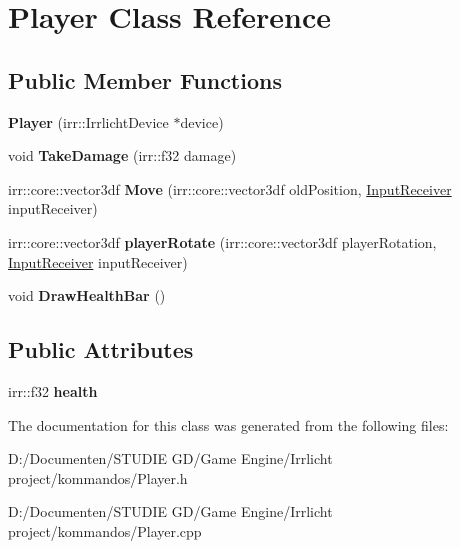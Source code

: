 \hypertarget{class_player}{}\section{Player Class Reference}
\label{class_player}
\subsection*{Public Member Functions}
\begin{DoxyCompactItemize}
\item 
\mbox{\label{class_player_ac207dd2957a2e3c4e734a9a074c2321d}} 
{\bfseries Player} (irr\+::\+Irrlicht\+Device $\ast$device)
\item 
\mbox{\label{class_player_ae9f5a597f15e29673c47abe47c3f1d79}} 
void {\bfseries Take\+Damage} (irr\+::f32 damage)
\item 
\mbox{\label{class_player_a2627aea6b6d7d02b60e449c4040ff592}} 
irr\+::core\+::vector3df {\bfseries Move} (irr\+::core\+::vector3df old\+Position, \mbox{\hyperlink{class_input_receiver}{Input\+Receiver}} input\+Receiver)
\item 
\mbox{\label{class_player_a942d6773ac43af9ada40121b665ff400}} 
irr\+::core\+::vector3df {\bfseries player\+Rotate} (irr\+::core\+::vector3df player\+Rotation, \mbox{\hyperlink{class_input_receiver}{Input\+Receiver}} input\+Receiver)
\item 
\mbox{\label{class_player_aa6cc636d92ca5ccba15a5af2ef7f224a}} 
void {\bfseries Draw\+Health\+Bar} ()
\end{DoxyCompactItemize}
\subsection*{Public Attributes}
\begin{DoxyCompactItemize}
\item 
\mbox{\label{class_player_a5d6e7e331bbca007b7f859798b04cd86}} 
irr\+::f32 {\bfseries health}
\end{DoxyCompactItemize}


The documentation for this class was generated from the following files\+:\begin{DoxyCompactItemize}
\item 
D\+:/\+Documenten/\+S\+T\+U\+D\+I\+E G\+D/\+Game Engine/\+Irrlicht project/kommandos/Player.\+h\item 
D\+:/\+Documenten/\+S\+T\+U\+D\+I\+E G\+D/\+Game Engine/\+Irrlicht project/kommandos/Player.\+cpp\end{DoxyCompactItemize}
